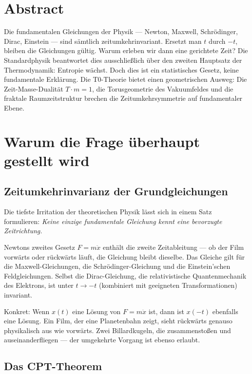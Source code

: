 
\section*{Abstract}
Die fundamentalen Gleichungen der Physik --- Newton, Maxwell, Schrödinger, Dirac, Einstein --- sind sämtlich zeitumkehrinvariant. Ersetzt man $t$ durch $-t$, bleiben die Gleichungen gültig. Warum erleben wir dann eine gerichtete Zeit? Die Standardphysik beantwortet dies ausschließlich über den zweiten Hauptsatz der Thermodynamik: Entropie wächst. Doch dies ist ein statistisches Gesetz, keine fundamentale Erklärung. Die T0-Theorie bietet einen geometrischen Ausweg: Die Zeit-Masse-Dualität $T \cdot m = 1$, die Torusgeometrie des Vakuumfeldes und die fraktale Raumzeitstruktur brechen die Zeitumkehrsymmetrie auf fundamentaler Ebene.

\section{Warum die Frage überhaupt gestellt wird}

\subsection{Zeitumkehrinvarianz der Grundgleichungen}

Die tiefste Irritation der theoretischen Physik lässt sich in einem Satz formulieren: \emph{Keine einzige fundamentale Gleichung kennt eine bevorzugte Zeitrichtung.}

Newtons zweites Gesetz $F = m\ddot{x}$ enthält die zweite Zeitableitung --- ob der Film vorwärts oder rückwärts läuft, die Gleichung bleibt dieselbe. Das Gleiche gilt für die Maxwell-Gleichungen, die Schrödinger-Gleichung und die Einstein'schen Feldgleichungen. Selbst die Dirac-Gleichung, die relativistische Quantenmechanik des Elektrons, ist unter $t \to -t$ (kombiniert mit geeigneten Transformationen) invariant.

Konkret: Wenn $x(t)$ eine Lösung von $F = m\ddot{x}$ ist, dann ist $x(-t)$ ebenfalls eine Lösung. Ein Film, der eine Planetenbahn zeigt, sieht rückwärts genauso physikalisch aus wie vorwärts. Zwei Billardkugeln, die zusammenstoßen und auseinanderfliegen --- der umgekehrte Vorgang ist ebenso erlaubt.

\subsection{Das CPT-Theorem}


